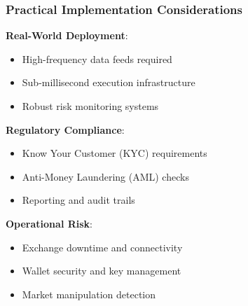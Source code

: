 \documentclass{beamer}
\begin{document}
\begin{frame}
\frametitle{Practical Implementation Considerations}
\textbf{Real-World Deployment}:
\begin{itemize}
    \item High-frequency data feeds required
    \item Sub-millisecond execution infrastructure
    \item Robust risk monitoring systems
\end{itemize}

\vspace{0.5cm}

\textbf{Regulatory Compliance}:
\begin{itemize}
    \item Know Your Customer (KYC) requirements
    \item Anti-Money Laundering (AML) checks
    \item Reporting and audit trails
\end{itemize}

\vspace{0.5cm}

\textbf{Operational Risk}:
\begin{itemize}
    \item Exchange downtime and connectivity
    \item Wallet security and key management
    \item Market manipulation detection
\end{itemize}
\end{frame}
\end{document}
